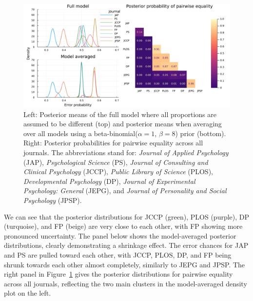 \documentclass[11pt,a4paper]{article}
\theoremstyle{definition} %
\theoremstyle{case}
\newcommand{\FD}[1]{\textcolor{red}{Fabian: #1 }}
\begin{document}
\begin{figure}
    \centering
    \includegraphics[width=\textwidth]{figures/application_proportions_2panel_plot.pdf}
    \caption{Left: Posterior means of the full model where all proportions are assumed to be different (top) and posterior means when averaging over all models using a beta-binomial($\alpha = 1$, $\beta = 8$) prior (bottom). Right: Posterior probabilities for pairwise equality across all journals. The abbreviations stand for: 
    \emph{Journal of Applied Psychology} (JAP), \emph{Psychological Science} (PS), \emph{Journal of Consulting and Clinical Psychology} (JCCP), \emph{ Public Library of Science} (PLOS), \emph{Developmental Psychology} (DP), \emph{Journal of Experimental Psychology: General} (JEPG), and \emph{Journal of Personality and Social Psychology} (JPSP).}
    \label{fig:demo_proportions}
\end{figure}

We can see that the posterior distributions for JCCP (green), PLOS (purple), DP (turquoise), and FP (beige) are very close to each other, with FP showing more pronounced uncertainty. The panel below shows the model-averaged posterior distributions, clearly demonstrating a shrinkage effect. The error chances for JAP and PS are pulled toward each other, with JCCP, PLOS, DP, and FP being shrunk towards each other almost completely, similarly to JEPG and JPSP. The right panel in Figure~\ref{fig:demo_proportions} gives the posterior distributions for pairwise equality across all journals, reflecting the two main clusters in the model-averaged density plot on the left.

\end{document}

